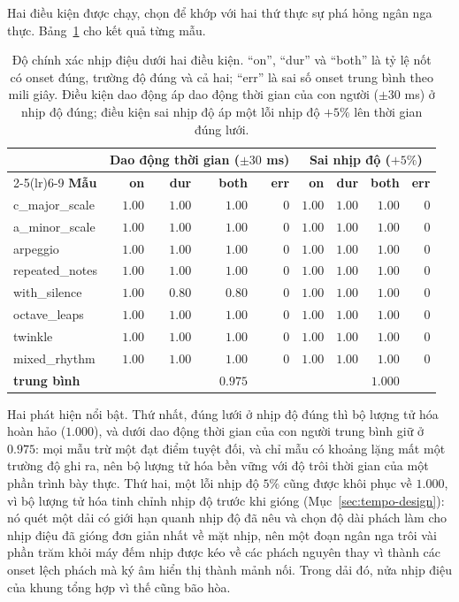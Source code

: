 \documentclass[12pt,a4paper]{article}
\begin{document}
Hai điều kiện được chạy, chọn để khớp với hai thứ thực sự phá hỏng ngân nga thực.
Bảng~\ref{tab:rhythm} cho kết quả từng mẫu.

\begin{table}[H]
\centering
\caption{Độ chính xác nhịp điệu dưới hai điều kiện. ``on'', ``dur'' và ``both'' là
tỷ lệ nốt có onset đúng, trường độ đúng và cả hai; ``err'' là sai số onset trung
bình theo mili giây. Điều kiện dao động áp dao động thời gian của con người
($\pm 30$ ms) ở nhịp độ đúng; điều kiện sai nhịp độ áp một lỗi nhịp độ $+5\%$ lên
thời gian đúng lưới.}
\label{tab:rhythm}
\begin{tabular}{l r r r r @{\hskip 1.5em} r r r r}
\toprule
 & \multicolumn{4}{c}{\textbf{Dao động thời gian ($\pm 30$ ms)}}
 & \multicolumn{4}{c}{\textbf{Sai nhịp độ ($+5\%$)}} \\
\cmidrule(lr){2-5}\cmidrule(lr){6-9}
\textbf{Mẫu} & \textbf{on} & \textbf{dur} & \textbf{both} & \textbf{err} &
\textbf{on} & \textbf{dur} & \textbf{both} & \textbf{err} \\
\midrule
c\_major\_scale  & $1.00$ & $1.00$ & $1.00$ & $0$ & $1.00$ & $1.00$ & $1.00$ & $0$ \\
a\_minor\_scale  & $1.00$ & $1.00$ & $1.00$ & $0$ & $1.00$ & $1.00$ & $1.00$ & $0$ \\
arpeggio         & $1.00$ & $1.00$ & $1.00$ & $0$ & $1.00$ & $1.00$ & $1.00$ & $0$ \\
repeated\_notes  & $1.00$ & $1.00$ & $1.00$ & $0$ & $1.00$ & $1.00$ & $1.00$ & $0$ \\
with\_silence    & $1.00$ & $0.80$ & $0.80$ & $0$ & $1.00$ & $1.00$ & $1.00$ & $0$ \\
octave\_leaps    & $1.00$ & $1.00$ & $1.00$ & $0$ & $1.00$ & $1.00$ & $1.00$ & $0$ \\
twinkle          & $1.00$ & $1.00$ & $1.00$ & $0$ & $1.00$ & $1.00$ & $1.00$ & $0$ \\
mixed\_rhythm    & $1.00$ & $1.00$ & $1.00$ & $0$ & $1.00$ & $1.00$ & $1.00$ & $0$ \\
\midrule
\textbf{trung bình}    &        &        & $\mathbf{0.975}$ & & & & $\mathbf{1.000}$ & \\
\bottomrule
\end{tabular}
\end{table}

Hai phát hiện nổi bật. Thứ nhất, đúng lưới ở nhịp độ đúng thì bộ lượng tử hóa hoàn
hảo ($1.000$), và dưới dao động thời gian của con người trung bình giữ ở $0.975$:
mọi mẫu trừ một đạt điểm tuyệt đối, và chỉ mẫu có khoảng lặng mất một trường độ ghi
ra, nên bộ lượng tử hóa bền vững với độ trôi thời gian của một phần trình bày thực.
Thứ hai, một lỗi nhịp độ $5\%$ cũng được khôi phục về $1.000$, vì bộ lượng tử hóa
tinh chỉnh nhịp độ trước khi gióng (Mục~\ref{sec:tempo-design}): nó quét một dải có
giới hạn quanh nhịp độ đã nêu và chọn độ dài phách làm cho nhịp điệu đã gióng đơn
giản nhất về mặt nhịp, nên một đoạn ngân nga trôi vài phần trăm khỏi máy đếm nhịp
được kéo về các phách nguyên thay vì thành các onset lệch phách mà ký âm hiển thị
thành mảnh nối. Trong dải đó, nửa nhịp điệu của khung tổng hợp vì thế cũng bão hòa.
\end{document}
